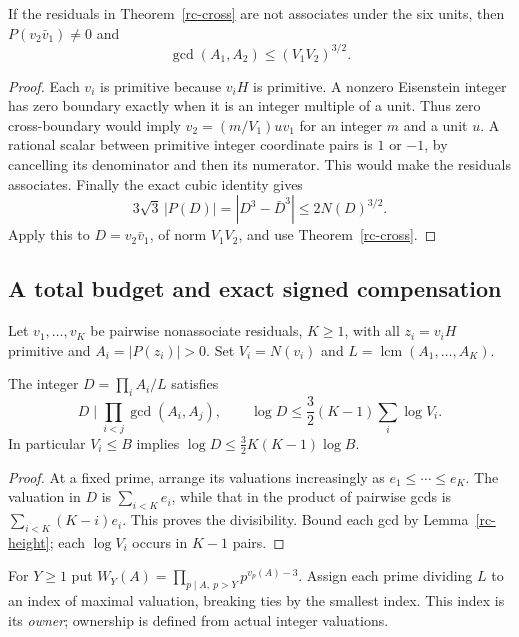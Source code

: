 \begin{lemma}\label{rc-height}
If the residuals in Theorem~\ref{rc-cross} are not associates under the six
units, then $P(v_2\bar v_1)\ne0$ and
\[
 \gcd(A_1,A_2)\le(V_1V_2)^{3/2}.
\]
\end{lemma}
\begin{proof}
Each $v_i$ is primitive because $v_iH$ is primitive. A nonzero Eisenstein
integer has zero boundary exactly when it is an integer multiple of a unit.
Thus zero cross-boundary would imply $v_2=(m/V_1)uv_1$ for an integer $m$
and a unit $u$. A rational scalar between primitive integer coordinate pairs
is $1$ or $-1$, by cancelling its denominator and then its numerator.
This would make the residuals associates. Finally the exact cubic identity gives
\[
 3\sqrt3\,|P(D)|=|D^3-\bar D^3|\le2N(D)^{3/2}.
\]
Apply this to $D=v_2\bar v_1$, of norm $V_1V_2$, and use
Theorem~\ref{rc-cross}.
\end{proof}

\subsection{A total budget and exact signed compensation}
Let $v_1,\ldots,v_K$ be pairwise nonassociate residuals, $K\ge1$, with all
$z_i=v_iH$ primitive and $A_i=|P(z_i)|>0$. Set $V_i=N(v_i)$ and
$L=\operatorname{lcm}(A_1,\ldots,A_K)$.

\begin{theorem}\label{rc-duplicate}
The integer $D=\prod_iA_i/L$ satisfies
\[
 D\mid\prod_{i<j}\gcd(A_i,A_j),\qquad
 \log D\le\frac32(K-1)\sum_i\log V_i.
\]
In particular $V_i\le B$ implies $\log D\le\frac32K(K-1)\log B$.
\end{theorem}
\begin{proof}
At a fixed prime, arrange its valuations increasingly as $e_1\le\cdots\le e_K$.
The valuation in $D$ is $\sum_{i<K}e_i$, while that in the product of pairwise
gcds is $\sum_{i<K}(K-i)e_i$. This proves the divisibility. Bound each gcd
by Lemma~\ref{rc-height}; each $\log V_i$ occurs in $K-1$ pairs.
\end{proof}

For $Y\ge1$ put $W_Y(A)=\prod_{p\mid A,\ p>Y}p^{v_p(A)-3}$.
Assign each prime dividing $L$ to an index of maximal valuation, breaking ties
by the smallest index. This index is its \emph{owner}; ownership is defined
from actual integer valuations.

